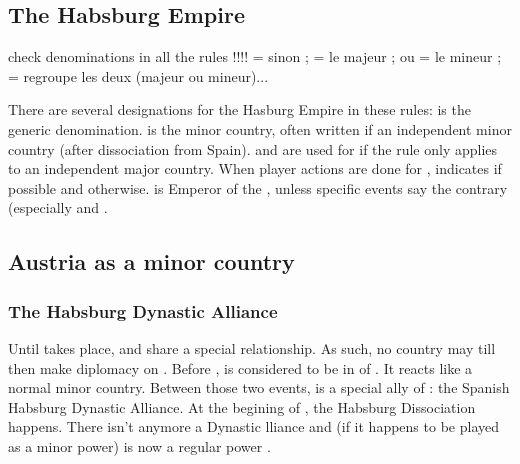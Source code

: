 \label{chSpecific:Austria}

\subsection{The Habsburg Empire}
\begin{todo}
  check denominations in all the rules !!!!  \MAJHAB = \AUS sinon \SPA;
  \AUS = le majeur ; \hab ou  = le mineur ; \HAB =
  regroupe les deux (majeur ou mineur)...
\end{todo}

\aparag There are several designations for the Hasburg Empire in these
rules: \HAB is the generic denomination.  is the minor
country, often written \hab if an independent minor country (after
dissociation from Spain).  and \AUS are used for
\HAB if the rule only applies to an independent major country. When
player actions are done for \MAJHAB, \MAJHAB indicates \AUS if possible and
\SPA otherwise.
\aparag \HAB is Emperor of the \HRE, unless specific events say the
contrary (especially  and
.

\subsection{Austria as a minor country}

\subsubsection{The Habsburg Dynastic Alliance}\label{chSpecific:Habsburg Dynastic Alliance}

\aparag Until  takes place, \SPA and 
share a special relationship. As such, no country may till then make
diplomacy on .
\bparag Before , \HAB is considered to be
in \EW of \SPA. It reacts like a normal minor country.
\bparag Between those two events,  is a special ally of
\SPA: the Spanish Habsburg Dynastic Alliance.
\bparag At the begining of , the Habsburg Dissociation
happens.  There isn't anymore a Dynastic lliance and (if
it happens to be played as a minor power) is now a regular power .

